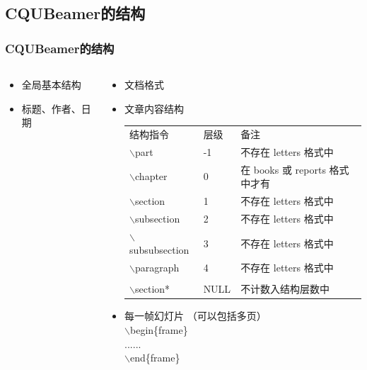 \documentclass[8pt,aspectratio=169,mathserif,UTF8]{beamer}
\begin{document}
\subsection{CQUBeamer的结构}
\begin{frame}
  \frametitle{CQUBeamer的结构}
  \begin{columns}
   \begin{column}{.35\textwidth}
     \begin{itemize}
      \item 全局基本结构 
      \item 标题、作者、日期 
      \end{itemize}
   \end{column}

	\begin{column}{.65\textwidth}
     \begin{itemize}
      \item 文档格式 
      \item 文章内容结构\\
      \begin{tabular}{lll}
      结构指令 & 层级 & 备注\\
      $\backslash$part & -1 & 不存在 letters 格式中\\
	   $\backslash$chapter & 0 & 在 books 或 reports 格式中才有\\
	   $\backslash$section & 1 & 不存在 letters 格式中\\
	   $\backslash$subsection & 2 & 不存在 letters 格式中\\
	   $\backslash$subsubsection & 3 & 不存在 letters 格式中\\
	   $\backslash$paragraph & 4 & 不存在 letters 格式中\\
	     & &\\
	   $\backslash$section*  & NULL & 不计数⼊结构层数中
      \end{tabular}
      
      \item 每一帧幻灯片 （可以包括多页）\\
      $\backslash$begin\{frame\}\\
      ......\\
      $\backslash$end\{frame\}
      
      \end{itemize}
	\end{column}
	\end{columns}
\end{frame}
\end{document}
